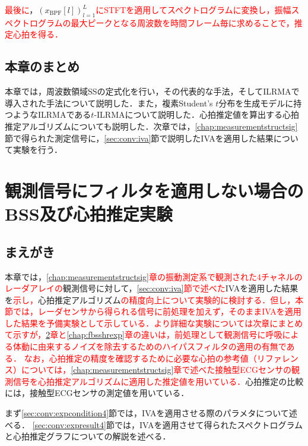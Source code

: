 \textcolor{red}{最後に}，$\left(x_{\mathrm{BPF}}[l]\right)_{l=1}^{L}$\textcolor{red}{にSTFTを適用してスペクトログラムに変換し，振幅スペクトログラムの最大ピークとなる周波数を時間フレーム毎に求めることで，推定心拍を得る．}

\section{本章のまとめ}
本章では，周波数領域SSの定式化を行い，その代表的な手法，そしてILRMAで導入された手法について説明した．また，複素Student's $t$分布を生成モデルに持つようなILRMAである$t$-ILRMAについて説明した．心拍推定値を算出する心拍推定アルゴリズムについても説明した．次章では，\ref{chap:measurementstructsig}節で得られた測定信号に，\ref{sec:conv:iva}節で説明したIVAを適用した結果について実験を行う．

\chapter{観測信号にフィルタを適用しない場合のBSS及び心拍推定実験}
\label{chap:bsshrexp}

\section{まえがき}
本章では，\textcolor{red}{\ref{chap:measurementstructsig}章の振動測定系で観測された4チャネルのレーダアレイの}観測信号に対して，\textcolor{red}{\ref{sec:conv:iva}節で述べた}IVAを適用した結果を\textcolor{red}{示し，}心拍推定アルゴリズム\textcolor{red}{の精度向上について実験的に検討する．但し，本節では，レーダセンサから得られる信号に前処理を加えず，そのままIVAを適用した結果を予備実験として示している．より詳細な実験については次章にまとめて示すが，\ref{chap:bsshrexp}章と\ref{chap:fbsshrexp}章の違いは，前処理として観測信号に呼吸による体動に由来するノイズを除去するためのハイパスフィルタの適用の有無である．}
\textcolor{red}{なお，心拍推定の精度を確認するために必要な心拍の参考値（リファレンス）については，\ref{chap:measurementstructsig}章で述べた接触型ECGセンサの観測信号を心拍推定アルゴリズムに適用した推定値を用いている．}心拍推定の比較には，接触型ECGセンサの測定値を用いている．

まず\ref{sec:conv:expcondition4}節では，IVAを適用させる際のパラメタについて述べる．
\ref{sec:conv:expresult4}節では，IVAを適用させて得られたスペクトログラムと心拍推定グラフについての解説を述べる．

